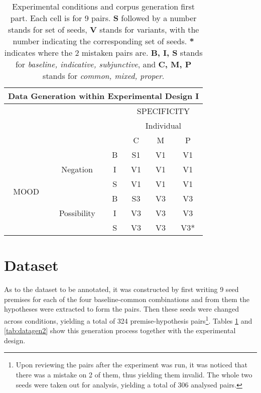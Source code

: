 \begin{table}[h!]
\centering
\begin{tabular}{|c|c|c|c|c|c|}
\hline
\multicolumn{6}{|c|}{Data Generation within Experimental Design I}\\\hline
                      & & &\multicolumn{3}{c|}{SPECIFICITY} \\\cline{4-6} 
                      & & & \multicolumn{3}{c|}{Individual}\\\cline{4-6} 
                      & & & C & M & P\\\hline 
\multirow{6}{*}{MOOD} & \multirow{3}{*}{Negation} & B & S1 & V1 &V1\\\cline{3-6}
                      &                           & I & V1 & V1 &V1\\\cline{3-6}
                      &                           & S & V1  &V1 &V1\\ \cline{2-6}\cline{2-6}                     
                      &\multirow{3}{*}{Possibility}& B & S3 &V3& V3 \\\cline{3-6}
                      &                           & I & V3 & V3 & V3\\\cline{3-6}
                      &                           & S & V3 & V3 & V3*\\\hline                                                          
\end{tabular}
\caption[Experimental conditions and corpus generation I.]{Experimental conditions and corpus generation first part. Each cell is for 9 pairs. \textbf{S} followed by a number stands for set of seeds, \textbf{V} stands for variants, with the number indicating the corresponding set of seeds. \textbf{*} indicates where the 2 mistaken pairs are. \textbf{B, I, S} stands for \textit{baseline, indicative, subjunctive}, and \textbf{C, M, P} stands for \textit{common, mixed, proper}.}
\label{tab:datagen1}
\end{table}

\section{Dataset}
As to the dataset to be annotated, it was constructed by first writing 9 seed premises for each of the four baseline-common combinations and from them the hypotheses were extracted to form the pairs. Then these seeds were changed across conditions, yielding a total of 324 premise-hypothesis pairs\footnote{Upon reviewing the pairs after the experiment was run, it was noticed that there was a mistake on 2 of them, thus yielding them invalid. The whole two seeds were taken out for analysis, yielding a total of 306 analysed pairs.}. Tables \ref{tab:datagen1} and \ref{tab:datagen2} show this generation process together with the experimental design.\\

